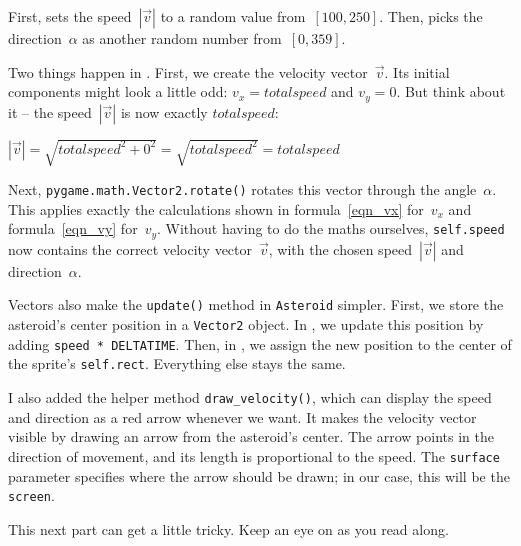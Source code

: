 First,  sets the speed~$|\vec v|$ to a random value from~$[100, 250]$. Then,  picks the direction~$\alpha$ as another random number from~$[0, 359]$.

Two things happen in . First, we create the velocity vector~$\vec v$. Its initial components might look a little odd: $v_x = totalspeed$ and $v_y = 0$. But think about it -- the speed~$|\vec v|$ is now exactly $totalspeed$:

$|\vec v| = \sqrt{totalspeed^2 + 0^2} = \sqrt{totalspeed^2} = totalspeed$

Next, \texttt{pygame.math.Vector2.rotate()} rotates this vector through the angle~$\alpha$. This applies exactly the calculations shown in formula~\ref{eqn_vx} for~$v_x$ and formula~\ref{eqn_vy} for~$v_y$. Without having to do the maths ourselves, \texttt{self.speed} now contains the correct velocity vector~$\vec v$, with the chosen speed~$|\vec v|$ and direction~$\alpha$.


Vectors also make the \texttt{update()} method in \texttt{Asteroid} simpler. First, we store the asteroid's center position in a \texttt{Vector2} object. In , we update this position by adding \texttt{speed * DELTATIME}. Then, in , we assign the new position to the center of the sprite's \texttt{self.rect}. Everything else stays the same.


I also added the helper method \texttt{draw\_velocity()}, which can display the speed and direction as a red arrow whenever we want. It makes the velocity vector visible by drawing an arrow from the asteroid's center. The arrow points in the direction of movement, and its length is proportional to the speed. The \texttt{surface} parameter specifies where the arrow should be drawn; in our case, this will be the \texttt{screen}.

\begin{hintbox}
	This next part can get a little tricky. Keep an eye on  as you read along.
\end{hintbox}

